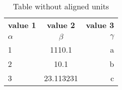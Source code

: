 \documentclass{article}
\begin{document}
	\begin{table}[h!]
		\begin{center}
			\caption{Table without aligned units}
			\label{tab:table1}
			\begin{tabular}{l|c|r}
				\textbf{value 1} & \textbf{value 2} & \textbf{value 3}\\
				$\alpha$ & $\beta$ & $\gamma$ \\
				\hline
				1 & 1110.1 & a\\
				2 & 10.1   & b\\
				3 & 23.113231 & c\\
			\end{tabular}
		\end{center}
	\end{table}
\end{document}
